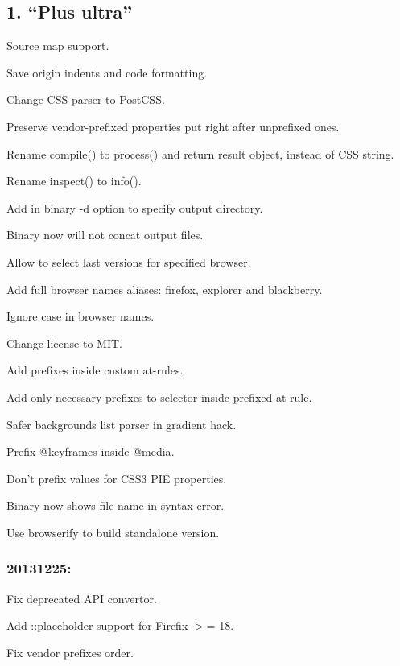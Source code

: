 \subsection*{1. “\+Plus ultra”}


\begin{DoxyItemize}
\item Source map support.
\item Save origin indents and code formatting.
\item Change C\+SS parser to Post\+C\+SS.
\item Preserve vendor-\/prefixed properties put right after unprefixed ones.
\item Rename {\ttfamily compile()} to {\ttfamily process()} and return result object, instead of C\+SS string.
\item Rename {\ttfamily inspect()} to {\ttfamily info()}.
\item Add in binary {\ttfamily -\/d} option to specify output directory.
\item Binary now will not concat output files.
\item Allow to select last versions for specified browser.
\item Add full browser names aliases\+: {\ttfamily firefox}, {\ttfamily explorer} and {\ttfamily blackberry}.
\item Ignore case in browser names.
\item Change license to M\+IT.
\item Add prefixes inside custom at-\/rules.
\item Add only necessary prefixes to selector inside prefixed at-\/rule.
\item Safer backgrounds list parser in gradient hack.
\item Prefix {\ttfamily @keyframes} inside {\ttfamily @media}.
\item Don’t prefix values for C\+S\+S3 P\+IE properties.
\item Binary now shows file name in syntax error.
\item Use browserify to build standalone version.
\end{DoxyItemize}

\subsubsection*{20131225\+:}


\begin{DoxyItemize}
\item Fix deprecated A\+PI convertor.
\item Add {\ttfamily \+::placeholder} support for Firefix $>$= 18.
\item Fix vendor prefixes order.
\end{DoxyItemize}


